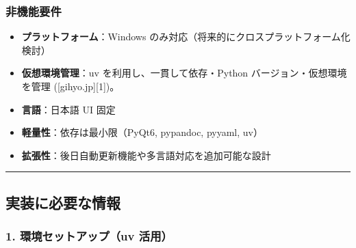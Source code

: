 \subsubsection{非機能要件}\label{ux975eux6a5fux80fdux8981ux4ef6}

\begin{itemize}
\tightlist
\item
  \textbf{プラットフォーム}：Windows のみ対応（将来的にクロスプラットフォーム化検討）
\item
  \textbf{仮想環境管理}：uv を利用し、一貫して依存・Python バージョン・仮想環境を管理 ({[}gihyo.jp{]}{[}1{]})。
\item
  \textbf{言語}：日本語 UI 固定
\item
  \textbf{軽量性}：依存は最小限（PyQt6, pypandoc, pyyaml, uv）
\item
  \textbf{拡張性}：後日自動更新機能や多言語対応を追加可能な設計
\end{itemize}

\begin{center}\rule{0.5\linewidth}{0.5pt}\end{center}

\subsection{実装に必要な情報}\label{ux5b9fux88c5ux306bux5fc5ux8981ux306aux60c5ux5831}

\subsubsection{1. 環境セットアップ（uv 活用）}\label{ux74b0ux5883ux30bbux30c3ux30c8ux30a2ux30c3ux30d7uv-ux6d3bux7528}

